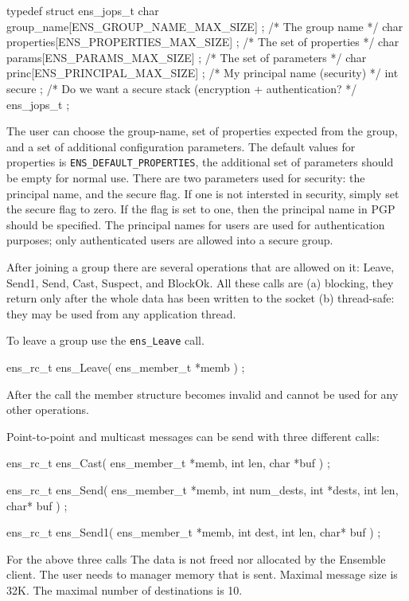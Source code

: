 \begin{codebox}
typedef struct ens_jops_t {
    char group_name[ENS_GROUP_NAME_MAX_SIZE] ; /* The group name */
    char properties[ENS_PROPERTIES_MAX_SIZE] ; /* The set of properties */
    char params[ENS_PARAMS_MAX_SIZE] ;         /* The set of parameters */
    char princ[ENS_PRINCIPAL_MAX_SIZE] ;       /* My principal name (security) */
    int secure ;                               /* Do we want a secure stack (encryption + authentication? */
} ens_jops_t ;
\end{codebox}

The user can choose the group-name, set of properties expected from
the group, and a set of additional configuration parameters. The
default values for properties is {\tt ENS\_DEFAULT\_PROPERTIES}, the
additional set of parameters should be empty for normal use. There are
two parameters used for security: the principal name, and the secure
flag. If one is not intersted in security, simply set the secure flag
to zero. If the flag is set to one, then the principal name in PGP 
should be specified. The principal names for users are used for
authentication purposes; only authenticated users are allowed into a
secure group. 

After joining a group there are several operations that are allowed on
it: Leave, Send1, Send, Cast, Suspect, and BlockOk. All these calls
are (a) blocking, they return only after the whole data has been
written to the socket (b) thread-safe: they may be used from any
application thread.

To leave a group use the {\tt ens\_Leave} call. 
\begin{codebox}
ens_rc_t ens_Leave(
    ens_member_t *memb
    ) ;
\end{codebox}
After the call the member structure becomes invalid and cannot be used
for any other operations. 

Point-to-point and multicast messages can be send with three different calls: 
\begin{codebox}
ens_rc_t ens_Cast(
    ens_member_t *memb,
    int len, 
    char *buf
    ) ;

ens_rc_t ens_Send(
    ens_member_t *memb,
    int num_dests,
    int *dests,
    int len, 
    char* buf
    ) ;

ens_rc_t ens_Send1(
    ens_member_t *memb,
    int dest,
    int len, 
    char* buf
    ) ;
\end{codebox}
For the above three calls The data is not freed nor allocated by the
Ensemble client. The user needs to manager memory that is
sent. Maximal message size is 32K. The maximal number of destinations
is 10.

